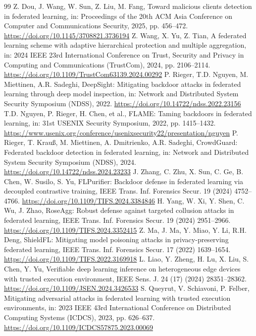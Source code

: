 \documentclass[final,5p,times,twocolumn]{elsarticle/elsarticle}
\begin{document}
\begin{thebibliography}{99}
     Z. Dou, J. Wang, W. Sun, Z. Liu, M. Fang, Toward malicious clients detection in federated learning, in: Proceedings of the 20th ACM Asia Conference on Computer and Communications Security, 2025, pp. 456--472. \url{https://doi.org/10.1145/3708821.3736194}
     Z. Wang, X. Yu, Z. Tian, A federated learning scheme with adaptive hierarchical protection and multiple aggregation, in: 2024 IEEE 23rd International Conference on Trust, Security and Privacy in Computing and Communications (TrustCom), 2024, pp. 2106--2114. \url{https://doi.org/10.1109/TrustCom63139.2024.00292}
     P. Rieger, T.D. Nguyen, M. Miettinen, A.R. Sadeghi, DeepSight: Mitigating backdoor attacks in federated learning through deep model inspection, in: Network and Distributed System Security Symposium (NDSS), 2022. \url{https://doi.org/10.14722/ndss.2022.23156}
     T.D. Nguyen, P. Rieger, H. Chen, et al., FLAME: Taming backdoors in federated learning, in: 31st USENIX Security Symposium, 2022, pp. 1415--1432. \url{https://www.usenix.org/conference/usenixsecurity22/presentation/nguyen}
     P. Rieger, T. Krau{\ss}, M. Miettinen, A. Dmitrienko, A.R. Sadeghi, CrowdGuard: Federated backdoor detection in federated learning, in: Network and Distributed System Security Symposium (NDSS), 2024. \url{https://doi.org/10.14722/ndss.2024.23233}
     J. Zhang, C. Zhu, X. Sun, C. Ge, B. Chen, W. Susilo, S. Yu, FLPurifier: Backdoor defense in federated learning via decoupled contrastive training, IEEE Trans. Inf. Forensics Secur. 19 (2024) 4752--4766. \url{https://doi.org/10.1109/TIFS.2024.3384846}
     H. Yang, W. Xi, Y. Shen, C. Wu, J. Zhao, RoseAgg: Robust defense against targeted collusion attacks in federated learning, IEEE Trans. Inf. Forensics Secur. 19 (2024) 2951--2966. \url{https://doi.org/10.1109/TIFS.2024.3352415}
     Z. Ma, J. Ma, Y. Miao, Y. Li, R.H. Deng, ShieldFL: Mitigating model poisoning attacks in privacy-preserving federated learning, IEEE Trans. Inf. Forensics Secur. 17 (2022) 1639--1654. \url{https://doi.org/10.1109/TIFS.2022.3169918}
     L. Liao, Y. Zheng, H. Lu, X. Liu, S. Chen, Y. Yu, Verifiable deep learning inference on heterogeneous edge devices with trusted execution environment, IEEE Sens. J. 24 (17) (2024) 28351--28362. \url{https://doi.org/10.1109/JSEN.2024.3426533}
     S. Queyrut, V. Schiavoni, P. Felber, Mitigating adversarial attacks in federated learning with trusted execution environments, in: 2023 IEEE 43rd International Conference on Distributed Computing Systems (ICDCS), 2023, pp. 626--637. \url{https://doi.org/10.1109/ICDCS57875.2023.00069}

\end{thebibliography}
\end{document}
